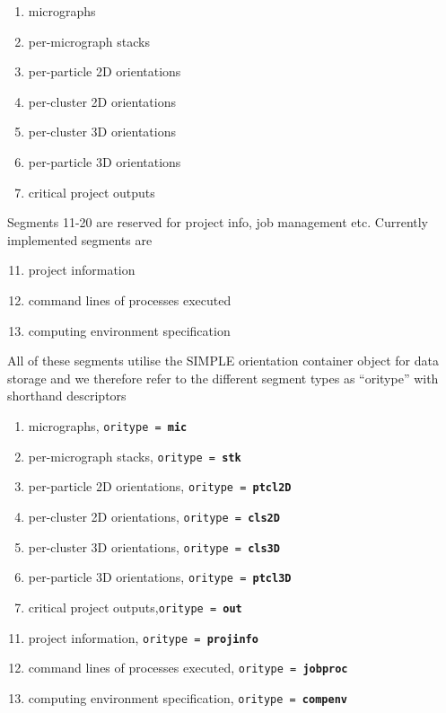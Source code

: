 \documentclass[a4paper,11pt]{article}
\begin{document}
\begin{enumerate}
    \item micrographs
    \item per-micrograph stacks
    \item per-particle 2D orientations
    \item per-cluster 2D orientations
    \item per-cluster 3D orientations
    \item per-particle 3D orientations
    \item critical project outputs
\end{enumerate}

\noindent{}Segments 11-20 are reserved for project info, job management etc. Currently implemented segments are

\begin{enumerate}
   \setcounter{enumi}{10}
    \item project information
    \item command lines of processes executed
    \item computing environment specification
\end{enumerate}

\noindent{}All of these segments utilise the SIMPLE orientation container object for data storage and we therefore refer to the different segment types as ``oritype'' with shorthand descriptors

\begin{enumerate}
    \item micrographs, \tab{}\texttt{oritype = \textbf{mic}}
    \item per-micrograph stacks, \tab{}\texttt{oritype = \textbf{stk}}
    \item per-particle 2D orientations, \tab{}\texttt{oritype = \textbf{ptcl2D}}
    \item per-cluster 2D orientations, \tab{}\texttt{oritype = \textbf{cls2D}}
    \item per-cluster 3D orientations, \tab{}\texttt{oritype = \textbf{cls3D}}
    \item per-particle 3D orientations, \tab{}\texttt{oritype = \textbf{ptcl3D}}
    \item critical project outputs,\tab{}\texttt{oritype = \textbf{out}}
\end{enumerate}

\begin{enumerate}
   \setcounter{enumi}{10}
    \item project information, \tab{}\texttt{oritype = \textbf{projinfo}}
    \item command lines of processes executed, \tab{}\texttt{oritype = \textbf{jobproc}}
    \item computing environment specification, \tab{}\texttt{oritype = \textbf{compenv}}
\end{enumerate}
\end{document}
